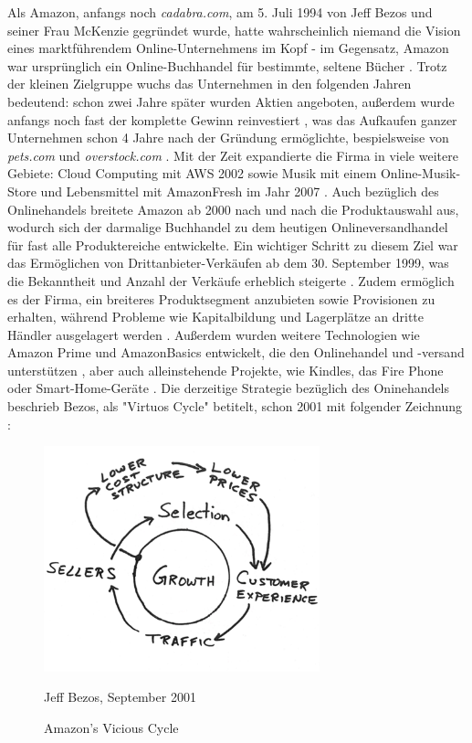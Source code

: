 Als Amazon, anfangs noch \emph{cadabra.com}, am 5. Juli 1994 von Jeff Bezos und seiner Frau McKenzie gegründet wurde, hatte wahrscheinlich niemand die Vision eines marktführendem Online-Unternehmens im Kopf - im Gegensatz, Amazon war ursprünglich ein Online-Buchhandel für bestimmte, seltene Bücher \cite[S. 17]{Graf}. Trotz der kleinen Zielgruppe wuchs das Unternehmen in den folgenden Jahren bedeutend: schon zwei Jahre später wurden Aktien angeboten, außerdem wurde anfangs noch fast der komplette Gewinn reinvestiert \cite{Rosoff}, was das Aufkaufen ganzer Unternehmen schon 4 Jahre nach der Gründung ermöglichte, bespielsweise von \emph{pets.com} und \emph{overstock.com} \cite{ChannelAdvisor}. Mit der Zeit expandierte die Firma in viele weitere Gebiete: Cloud Computing mit \ac{AWS} 2002 sowie Musik mit einem Online-Musik-Store und Lebensmittel mit AmazonFresh im Jahr 2007 \cite{Sherman, ChannelAdvisor}. Auch bezüglich des Onlinehandels breitete Amazon ab 2000 nach und nach die Produktauswahl aus, wodurch sich der darmalige Buchhandel zu dem heutigen Onlineversandhandel für fast alle Produktereiche entwickelte. Ein wichtiger Schritt zu diesem Ziel war das Ermöglichen von Drittanbieter-Verkäufen ab dem 30. September 1999, was die Bekanntheit und Anzahl der Verkäufe erheblich steigerte \cite{Sherman}. Zudem ermöglich es der Firma, ein breiteres Produktsegment anzubieten sowie Provisionen zu erhalten, während Probleme wie Kapitalbildung und Lagerplätze an dritte Händler ausgelagert werden \cite[S. 50]{evilcom}. Außerdem wurden weitere Technologien wie Amazon Prime und AmazonBasics entwickelt, die den Onlinehandel und -versand unterstützen \cite{ChannelAdvisor}, aber auch alleinstehende Projekte, wie Kindles, das Fire Phone oder Smart-Home-Geräte \cite{Sherman}.
Die derzeitige Strategie bezüglich des Oninehandels beschrieb Bezos, als "Virtuos Cycle" betitelt, schon 2001  mit folgender Zeichnung \cite{zentail}:

\begin{figure}[h]
    \begin{center}
        \includegraphics[width=8cm]{media/Fabian-vicious-cycle.png}
        \caption{Amazon's Vicious Cycle}
        \label{vicious-cycle}
        \bildquelle Jeff Bezos, September 2001 %
    \end{center}
\end{figure} 

